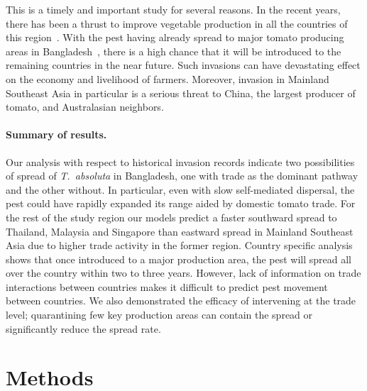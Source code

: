 \documentclass[11pt]{article}
\newcommand{\tuta}{\emph{T.~absoluta}}
\theoremstyle{definition}
\begin{document}


This is a timely and important study for several reasons. In the recent
years, there has been a thrust to improve vegetable production in all the
countries of this region~\cite{ali2001}. With the pest having
already spread to major tomato producing areas in
Bangladesh~\cite{hossain2016first}, there is a high chance that it will be
introduced to the remaining countries in the near future. Such invasions
can have devastating effect on the economy and livelihood of farmers.
Moreover, invasion in Mainland Southeast Asia in particular is a serious
threat to China, the largest producer of tomato, and Australasian
neighbors.


\paragraph{Summary of results.} 
Our analysis with respect to historical invasion records indicate two
possibilities of spread of \tuta{} in Bangladesh, one with trade as the
dominant pathway and the other without. In particular, even with slow
self-mediated dispersal, the pest could have rapidly expanded its range
aided by domestic tomato trade. For the rest of the study region our models
predict a faster southward spread to Thailand, Malaysia and Singapore than
eastward spread in Mainland Southeast Asia due to higher trade activity in
the former region. Country specific analysis shows that once introduced to
a major production area, the pest will spread all over the country within
two to three years. However, lack of information on trade interactions
between countries makes it difficult to predict pest movement between
countries. We also demonstrated the efficacy of intervening at the trade
level; quarantining few key production areas can contain the spread or
significantly reduce the spread rate.

\section{Methods}
\end{document}
